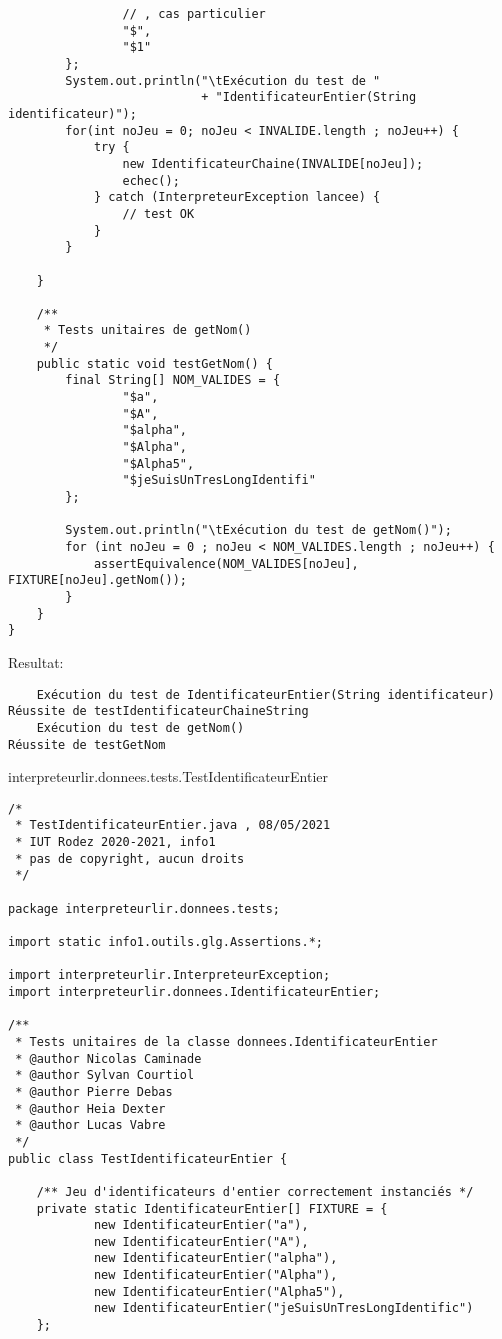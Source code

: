 \begin{enum}
\begin{verbatim}
                // , cas particulier
                "$",
                "$1"
        };
        System.out.println("\tExécution du test de "
                           + "IdentificateurEntier(String identificateur)");
        for(int noJeu = 0; noJeu < INVALIDE.length ; noJeu++) {
            try {
                new IdentificateurChaine(INVALIDE[noJeu]);
                echec();
            } catch (InterpreteurException lancee) {
                // test OK
            }
        }
        
    }

    /**
     * Tests unitaires de getNom()
     */
    public static void testGetNom() {
        final String[] NOM_VALIDES = {
                "$a",
                "$A",
                "$alpha",
                "$Alpha",
                "$Alpha5",
                "$jeSuisUnTresLongIdentifi"
        };

        System.out.println("\tExécution du test de getNom()");
        for (int noJeu = 0 ; noJeu < NOM_VALIDES.length ; noJeu++) {
            assertEquivalence(NOM_VALIDES[noJeu], FIXTURE[noJeu].getNom());
        }
    }
}
\end{verbatim}
Resultat:
\begin{verbatim}
    Exécution du test de IdentificateurEntier(String identificateur)
Réussite de testIdentificateurChaineString
    Exécution du test de getNom()
Réussite de testGetNom
\end{verbatim}

    \item interpreteurlir.donnees.tests.TestIdentificateurEntier
\begin{verbatim}
/*
 * TestIdentificateurEntier.java , 08/05/2021
 * IUT Rodez 2020-2021, info1
 * pas de copyright, aucun droits
 */

package interpreteurlir.donnees.tests;

import static info1.outils.glg.Assertions.*;

import interpreteurlir.InterpreteurException;
import interpreteurlir.donnees.IdentificateurEntier;

/**
 * Tests unitaires de la classe donnees.IdentificateurEntier
 * @author Nicolas Caminade
 * @author Sylvan Courtiol
 * @author Pierre Debas
 * @author Heia Dexter
 * @author Lucas Vabre
 */
public class TestIdentificateurEntier {

    /** Jeu d'identificateurs d'entier correctement instanciés */
    private static IdentificateurEntier[] FIXTURE = {
            new IdentificateurEntier("a"),
            new IdentificateurEntier("A"),
            new IdentificateurEntier("alpha"),
            new IdentificateurEntier("Alpha"),
            new IdentificateurEntier("Alpha5"),
            new IdentificateurEntier("jeSuisUnTresLongIdentific")
    };


\end{verbatim}
\end{enum}

